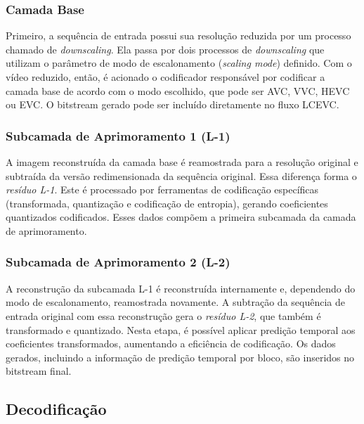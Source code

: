 \subsubsection{Camada Base}

Primeiro, a sequência de entrada possui sua resolução reduzida por um processo chamado de
\textit{downscaling}. Ela passa por dois processos de \textit{downscaling} que utilizam
o parâmetro de modo de escalonamento (\textit{scaling mode}) definido. Com o vídeo
reduzido, então, é acionado o codificador responsável por codificar a camada base de acordo
com o modo escolhido, que pode ser \acrshort{AVC}, \acrshort{VVC}, \acrshort{HEVC} ou
\acrshort{EVC}. O bitstream gerado pode ser incluído diretamente no fluxo LCEVC. 
\cite{MPEG2022LCEVC, overview_lcevc}

\subsubsection{Subcamada de Aprimoramento 1 (L-1)}

A imagem reconstruída da camada base é reamostrada para a resolução original e subtraída da
versão redimensionada da sequência original. Essa diferença forma o \textit{resíduo L-1}. 
Este é processado por ferramentas de codificação específicas (transformada, quantização e 
codificação de entropia), gerando coeficientes quantizados codificados. 
Esses dados compõem a primeira subcamada da camada de aprimoramento. \cite{MPEG2022LCEVC,
overview_lcevc}

\subsubsection{Subcamada de Aprimoramento 2 (L-2)}

A reconstrução da subcamada L-1 é reconstruída internamente e, dependendo do modo de escalonamento, 
reamostrada novamente. A subtração da sequência de entrada original com essa reconstrução gera o 
\textit{resíduo L-2}, que também é transformado e quantizado. Nesta etapa, é possível aplicar 
predição temporal aos coeficientes transformados, aumentando a eficiência de codificação. Os dados 
gerados, incluindo a informação de predição temporal por bloco, são inseridos no bitstream final. 
\cite{MPEG2022LCEVC, overview_lcevc}

\subsection{Decodificação}

